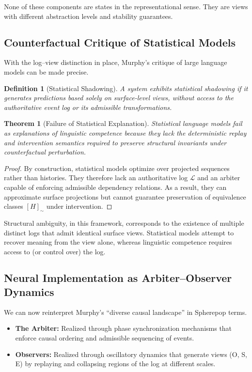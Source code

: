 \documentclass[11pt]{article}
\newtheorem{definition}{Definition}
\newtheorem{theorem}{Theorem}
\begin{document}
None of these components are states in the representational sense. They are views with different abstraction levels and stability guarantees.

\subsection{Counterfactual Critique of Statistical Models}

With the log--view distinction in place, Murphy’s critique of large language models can be made precise.

\begin{definition}[Statistical Shadowing]
A system exhibits \emph{statistical shadowing} if it generates predictions based solely on surface-level views, without access to the authoritative event log or its admissible transformations.
\end{definition}

\begin{theorem}[Failure of Statistical Explanation]
Statistical language models fail as explanations of linguistic competence because they lack the deterministic replay and intervention semantics required to preserve structural invariants under counterfactual perturbation.
\end{theorem}

\begin{proof}
By construction, statistical models optimize over projected sequences rather than histories. They therefore lack an authoritative log $\mathcal{L}$ and an arbiter capable of enforcing admissible dependency relations. As a result, they can approximate surface projections but cannot guarantee preservation of equivalence classes $[H]_{\sim}$ under intervention.
\end{proof}

Structural ambiguity, in this framework, corresponds to the existence of multiple distinct logs that admit identical surface views. Statistical models attempt to recover meaning from the view alone, whereas linguistic competence requires access to (or control over) the log.

\subsection{Neural Implementation as Arbiter--Observer Dynamics}

We can now reinterpret Murphy’s “diverse causal landscape” in Spherepop terms.

\begin{itemize}
  \item \textbf{The Arbiter:} Realized through phase synchronization mechanisms that enforce causal ordering and admissible sequencing of events.
  \item \textbf{Observers:} Realized through oscillatory dynamics that generate views (O, S, E) by replaying and collapsing regions of the log at different scales.
\end{itemize}
\end{document}
